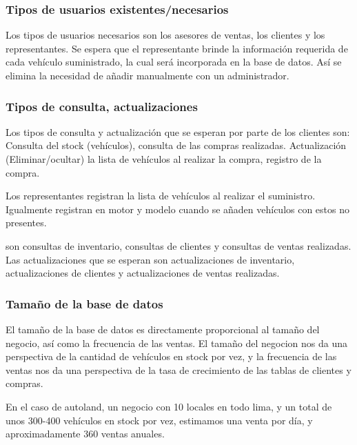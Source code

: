 \documentclass[12pt]{article}
\begin{document}
\subsubsection{Tipos de usuarios existentes/necesarios}

Los tipos de usuarios necesarios son los asesores de ventas, los clientes y los representantes. Se espera que el representante brinde la información requerida de cada vehículo suministrado, la cual será incorporada en la base de datos. Así se elimina la necesidad de añadir manualmente con un administrador.

\subsubsection{Tipos de consulta, actualizaciones}

Los tipos de consulta y actualización que se esperan por parte de los clientes son: Consulta del stock (vehículos),  consulta de las compras realizadas. Actualización (Eliminar/ocultar) la lista de vehículos al realizar la compra, registro de la compra.

Los representantes registran la lista de vehículos al realizar el suministro. Igualmente registran en motor y modelo cuando se añaden vehículos con estos no presentes.

son consultas de inventario, consultas de clientes y consultas de ventas realizadas. Las actualizaciones que se esperan son actualizaciones de inventario, actualizaciones de clientes y actualizaciones de ventas realizadas.


\subsubsection{Tama\~no de la base de datos}

El tamaño de la base de datos es directamente proporcional al tamaño del negocio, así como la frecuencia de las ventas. El tamaño del negocion nos da una perspectiva de la cantidad de vehículos en stock por vez, y la frecuencia de las ventas nos da una perspectiva de la tasa de crecimiento de las tablas de clientes y compras.

En el caso de autoland, un negocio con 10 locales en todo lima, y un total de unos 300-400 vehículos en stock por vez, estimamos una venta por día, y aproximadamente 360 ventas anuales.

\newpage
\end{document}
